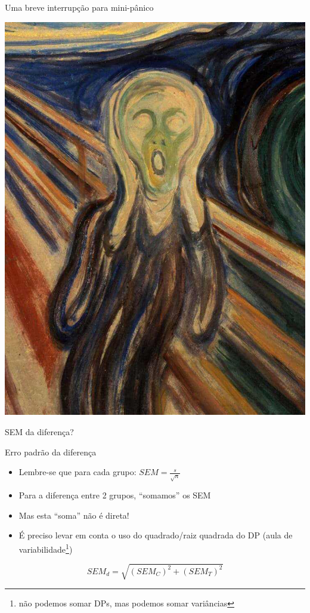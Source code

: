 \documentclass{beamer}
\begin{document}
\begin{frame}{\scriptsize Uma breve interrupção para mini-pânico}
  \begin{center}
    \includegraphics[height=.7\textheight]{Cap7/ogrito}
  \end{center}
  \begin{block}{}
    \begin{center}
      SEM da diferença?
    \end{center}
  \end{block}
\end{frame}

\begin{frame}{\scriptsize Erro padrão da diferença}
  \begin{itemize}
    \footnotesize
  \item Lembre-se que para cada grupo: $SEM = \frac{s}{\sqrt{n}}$
  \item Para a diferença entre 2 grupos, ``somamos'' os SEM
  \item Mas esta ``soma'' não é direta!
  \item É preciso levar em conta o uso do quadrado/raiz quadrada do DP (aula de variabilidade\footnote{não podemos somar DPs, mas podemos somar variâncias})
  \end{itemize}
  \begin{block}{}
      \begin{displaymath}
    SEM_d = \sqrt{(SEM_C)^2 + (SEM_T)^2}
  \end{displaymath}
  \end{block}
\end{frame}
\end{document}
